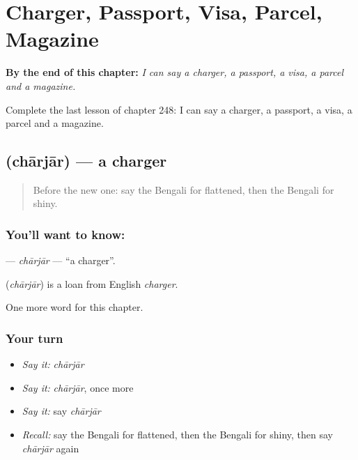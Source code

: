 
\chapter{Charger, Passport, Visa, Parcel, Magazine}
\label{ch:bn-charger-passport-visa-parcel-magazine}

\begin{chapteropening}
\textbf{By the end of this chapter:} \emph{I can say a charger, a passport, a visa, a parcel and a magazine.}

Complete the last lesson of chapter 248: I can say a charger, a passport, a visa, a parcel and a magazine.
\end{chapteropening}

\section[\texorpdfstring{\bn{চার্জার} (chārjār)}{চার্জার (chārjār)}]{ (chārjār) — a charger}

\label{lesson:BN-C248-charjar}



\begin{quote}
Before the new one: say the Bengali for flattened, then the Bengali for shiny.
\end{quote}

\subsection*{You'll want to know: }
\textbf{} — \emph{chārjār} — \textquotedblleft{}a charger\textquotedblright{}.

\begin{cousinweb}
\textbf{} (\emph{chārjār}) is a loan from English \emph{charger}.
\end{cousinweb}

\begin{grammarlens}[title={What you've built}]
One more word for this chapter.
\end{grammarlens}

\subsection*{Your turn}
\begin{itemize}
\raggedright
  \item \emph{Say it:} \emph{chārjār}
  \item \emph{Say it:} \emph{chārjār}, once more
  \item \emph{Say it:} say \emph{chārjār}
  \item \emph{Recall:} say the Bengali for flattened, then the Bengali for shiny, then say \emph{chārjār} again
\end{itemize}

